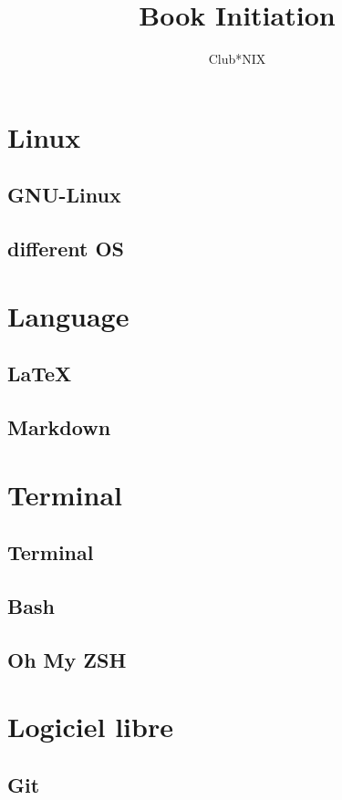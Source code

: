 \documentclass[a4paper]{report}
\title{Book Initiation}
\author{Club*NIX}
\begin{document}
\maketitle

\tableofcontents
\newpage


\chapter{Linux}
 \section{GNU-Linux}
    
 \section{different OS}
    
    
\chapter{Language}
  \section{LaTeX}
    
  \section{Markdown}
    
    
\chapter{Terminal}
  \section{Terminal}
    
  \section{Bash}
    
  \section{Oh My ZSH}
    
    
\chapter{Logiciel libre}
	
  \section{Git}
    
\end{document}
